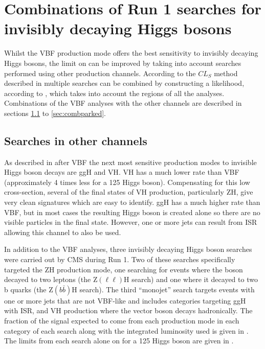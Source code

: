 \chapter{Combinations of Run 1 searches for invisibly decaying Higgs bosons}
\label{chap:comb}
Whilst the \ac{VBF} production mode offers the best sensitivity to invisibly decaying Higgs bosons, the limit on \BRinv can be improved by taking into account searches performed using other production channels. According to the $CL_{S}$ method described in  multiple searches can be combined by constructing a likelihood, according to , which takes into account the regions of all the analyses. Combinations of the \ac{VBF} analyses with the other channels are described in sections \ref{sec:combotherchannels} to \ref{sec:combparked}. 


\section{Searches in other channels}
\label{sec:combotherchannels}
As described in  after \ac{VBF} the next most sensitive production modes to invisible Higgs boson decays are \ac{ggH} and \ac{VH}. \ac{VH} has a much lower rate than \ac{VBF} (approximately 4 times less for a 125 \GeV Higgs boson). Compensating for this low cross-section, several of the final states of \ac{VH} production, particularly \ac{ZH}, give very clean signatures which are easy to identify. \ac{ggH} has a much higher rate than \ac{VBF}, but in most cases the resulting Higgs boson is created alone so there are no visible particles in the final state. However, one or more jets can result from \ac{ISR} allowing this channel to also be used. 

In addition to the \ac{VBF} analyses, three invisibly decaying Higgs boson searches were carried out by CMS during Run 1. Two of these searches specifically targeted the \ac{ZH} production mode, one searching for events where the \PZ boson decayed to two leptons (the Z$(\ell\ell)$H search) and one where it decayed to two b quarks (the Z$(b\bar{b})$H search). The third ``monojet'' search targets events with one or more jets that are not \ac{VBF}-like and includes categories targeting \ac{ggH} with \ac{ISR}, and \ac{VH} production where the vector boson decays hadronically. The fraction of the signal expected to come from each production mode in each category of each search along with the integrated luminosity used is given in . The limits from each search alone on \BRinv for a 125 \GeV Higgs boson are given in .

